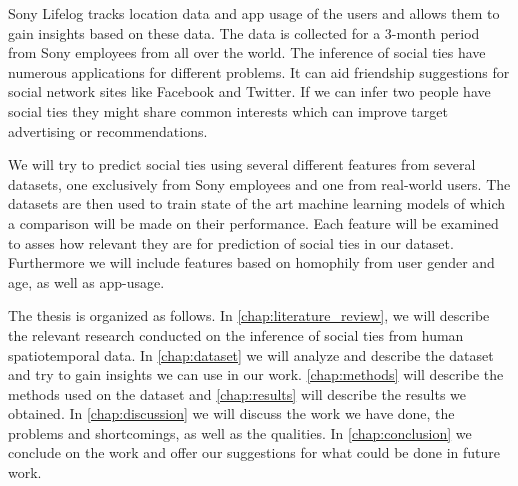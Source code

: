 Sony Lifelog tracks location data and app usage of the users and allows them to gain insights based on these data. The data is collected for a 3-month period from Sony employees from all over the world.
The inference of social ties have numerous applications for different problems. It can aid friendship suggestions for social network sites like Facebook and Twitter. If we can infer two people have social ties they might share common interests which can improve target advertising or recommendations\cite{yu2015investigating}.

We will try to predict social ties using several different features from several datasets, one exclusively from Sony employees and one from real-world users. The datasets are then used to train state of the art machine learning models of which a comparison will be made on their performance. Each feature will be examined to asses how relevant they are for prediction of social ties in our dataset. Furthermore we will include features based on homophily\cite{mcpherson2001birds} from user gender and age, as well as app-usage.

The thesis is organized as follows. In \autoref{chap:literature_review}, we will describe the relevant research conducted on the inference of social ties from human spatiotemporal data. In \autoref{chap:dataset} we will analyze and describe the dataset and try to gain insights we can use in our work. \autoref{chap:methods} will describe the methods used on the dataset and \autoref{chap:results} will describe the results we obtained. In \autoref{chap:discussion} we will discuss the work we have done, the problems and shortcomings, as well as the qualities. In \autoref{chap:conclusion} we conclude on the work and offer our suggestions for what could be done in future work.


